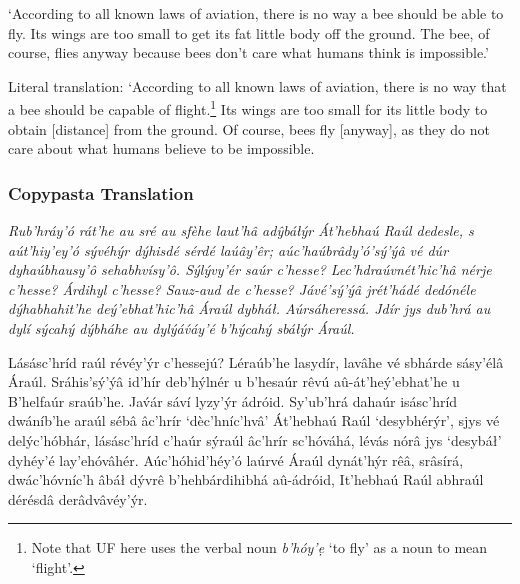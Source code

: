 \documentclass[a4paper, 12pt, twoside, final]{article}
\let \w \textit
\begin{document}
\medskip\noindent
‘According to all known laws of aviation, there is no way a bee should be able to fly. Its wings are too
small to get its fat little body off the ground. The bee, of course, flies anyway because bees don't care
what humans think is impossible.’

\medskip\noindent
Literal translation: ‘According to all known laws of aviation, there is no way that a bee should be capable of flight.\footnote{
Note that UF here uses the verbal noun \w{b’hóy’ẹ} ‘to fly’ as a noun to mean ‘flight’.}
Its wings are too small for its little body to obtain [distance] from the ground. Of course, bees fly [anyway], as
they do not care about what humans believe to be impossible.

\subsubsection{Copypasta Translation}
{\itshape
Rub’hráy’ó rát’he au sré au sfèhe laut’hâ adŷbáłýr Át’hebhaú Raúl dedesle, s aút’hiy’ey’ó sývéhýr dýhisdé sérdé laúây’êr;
aúc’haúbrâdy’ó’sý’ýâ vé dúr dyhaúbhausy’ô sehabhvísy’ô. Sýlývy’ér saúr c’hesse? Lec’hdr\-aúv\-nét’hic’hâ nérje c’hesse?
Árdihyl c’hesse? Sauz-aud de c’hesse? Jávé’sý’ýâ jrét’hádé dedónéle dýha\-bha\-hit’he deý’ebhat’hic’hâ Áraúl dybháł.
Aúrsáheressá. Jdír jys dub’hrá au dylí sýcahý dýbháhe au dylýáv́áy’é b’hýcahý sbáłýr Áraúl.

Lásásc’hríd raúl révéy’ýr c’hessejú? Léraúb’he lasydír, lavâhe vé sbhárde sásy’élâ Áraúl. Sráhis’sý’ýâ id’hír deb’hýlnér
u b’hesaúr rêvú aû-át’heý’ebhat’he u B’helfaúr sraúb’he. Jav́ár sáví lyzy’ýr ádróid. Sy’u\-b’h\-rá dahaúr isásc’hríd
dwáníb’he araúl sébâ âc’hrír ‘dèc’hníc’hvâ’ Át’hebhaú Raúl ‘desybhérýr’, sjys vé delýc’hóbhár, lásásc’hríd c’haúr sýraúl
âc’hrír sc’hóváhá, lévás nórâ jys ‘desybáł’ dyhéy’é la\-y’e\-hó\-vâ\-hér. Aúc’hóhid’héy’ó laúrvé Áraúl dynát’hýr rêâ, srâsírá,
dwác’hóvníc’h âbáł dývrê b’hehbár\-di\-hi\-bhá aû-á\-dr\-ó\-id, It’hebhaú Raúl abhraúl dérésdâ derâdvâvéy’ýr.
}

\end{document}
